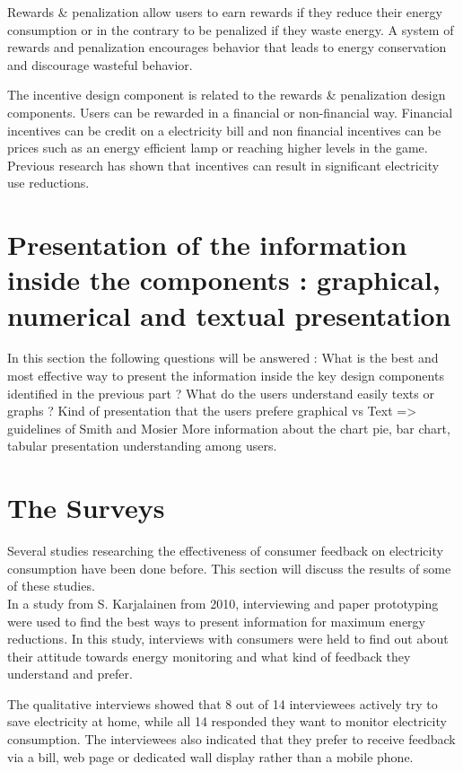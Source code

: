 \documentclass[journal]{vgtc}                %
\begin{document}
Rewards \& penalization allow users to earn rewards if they reduce their energy consumption or in the contrary to be penalized if they waste energy. A system of rewards and penalization encourages behavior that leads to energy conservation and discourage wasteful behavior.

The incentive design component is related to the rewards \& penalization design components. Users can be rewarded in a financial or non-financial way. Financial incentives can be credit on a electricity bill and non financial incentives can be prices such as an energy efficient lamp or reaching higher levels in the game.
Previous research \cite{petersen2007dormitory} has shown that incentives can result in significant electricity use reductions.

\section{Presentation of the information inside the components : graphical, numerical and textual presentation} %
In this section the following questions will be answered : What is the best and most effective way to present the information inside the key design components identified in the previous part ? What do the users understand easily texts or graphs ?
Kind of presentation that the users prefere graphical vs Text => guidelines of Smith and Mosier
More information about the chart pie, bar chart, tabular presentation understanding among users.

\section{The Surveys}
Several studies researching the effectiveness of consumer feedback on electricity consumption have been done before.
This section will discuss the results of some of these studies. \\

In a study from S. Karjalainen\cite{karjalainen2011consumer} from 2010, interviewing and paper prototyping were used to find the best ways to present information for maximum energy reductions. In this study, interviews with consumers were held to find out about their attitude towards energy monitoring and what kind of feedback they understand and prefer.

The qualitative interviews showed that 8 out of 14 interviewees actively try to save electricity at home, while all 14 responded they want to monitor electricity consumption. The interviewees also indicated that they prefer to receive feedback via a bill, web page or dedicated wall display rather than a mobile phone. \\
\end{document}
